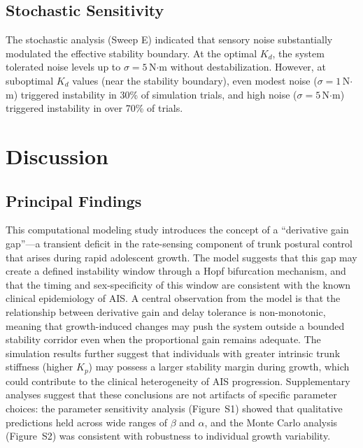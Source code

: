 \documentclass[12pt,a4paper]{article}
\begin{document}
\subsection{Stochastic Sensitivity}

The stochastic analysis (Sweep E) indicated that sensory noise substantially modulated the effective stability boundary. At the optimal $K_d$, the system tolerated noise levels up to $\sigma = 5$\,N$\cdot$m without destabilization. However, at suboptimal $K_d$ values (near the stability boundary), even modest noise ($\sigma = 1$\,N$\cdot$m) triggered instability in 30\% of simulation trials, and high noise ($\sigma = 5$\,N$\cdot$m) triggered instability in over 70\% of trials.

\section{Discussion}

\subsection{Principal Findings}

This computational modeling study introduces the concept of a ``derivative gain gap''---a transient deficit in the rate-sensing component of trunk postural control that arises during rapid adolescent growth. The model suggests that this gap may create a defined instability window through a Hopf bifurcation mechanism, and that the timing and sex-specificity of this window are consistent with the known clinical epidemiology of AIS. A central observation from the model is that the relationship between derivative gain and delay tolerance is non-monotonic, meaning that growth-induced changes may push the system outside a bounded stability corridor even when the proportional gain remains adequate. The simulation results further suggest that individuals with greater intrinsic trunk stiffness (higher $K_p$) may possess a larger stability margin during growth, which could contribute to the clinical heterogeneity of AIS progression. Supplementary analyses suggest that these conclusions are not artifacts of specific parameter choices: the parameter sensitivity analysis (Figure~S1) showed that qualitative predictions held across wide ranges of $\beta$ and $\alpha$, and the Monte Carlo analysis (Figure~S2) was consistent with robustness to individual growth variability.
\end{document}
